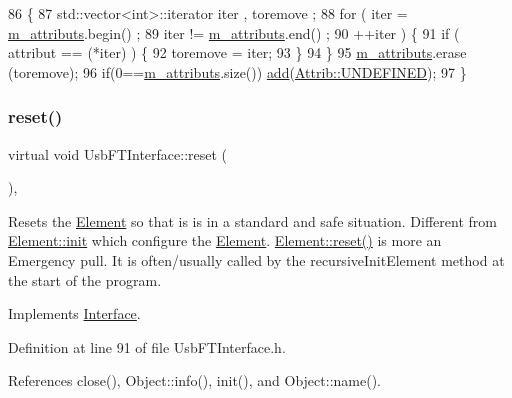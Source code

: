 \begin{DoxyCode}
86                                \{
87     std::vector<int>::iterator iter , toremove ;
88     \textcolor{keywordflow}{for} ( iter  = \hyperlink{classAttrib_ac4bd58a0cc6b38a3b711d609a3d3aacc}{m\_attributs}.begin() ;
89           iter != \hyperlink{classAttrib_ac4bd58a0cc6b38a3b711d609a3d3aacc}{m\_attributs}.end()   ;
90           ++iter ) \{
91       \textcolor{keywordflow}{if} ( attribut == (*iter) ) \{
92         toremove = iter;
93       \}
94     \}
95     \hyperlink{classAttrib_ac4bd58a0cc6b38a3b711d609a3d3aacc}{m\_attributs}.erase (toremove);
96     \textcolor{keywordflow}{if}(0==\hyperlink{classAttrib_ac4bd58a0cc6b38a3b711d609a3d3aacc}{m\_attributs}.size()) \hyperlink{classAttrib_a235f773af19c900264a190b00a3b4ad7}{add}(\hyperlink{classAttrib_a69e171d7cc6417835a5a306d3c764235a3a8da2ab97dda18aebab196fe4100531}{Attrib::UNDEFINED});
97   \}
\end{DoxyCode}
\mbox{\label{classUsbFTInterface_a7bd95c22da69daeaad7f752f560740f4}} 
\subsubsection{\texorpdfstring{reset()}{reset()}}
{\footnotesize\ttfamily virtual void Usb\+F\+T\+Interface\+::reset (\begin{DoxyParamCaption}{ }\end{DoxyParamCaption})\hspace{0.3cm}{\ttfamily [inline]}, {\ttfamily [virtual]}}

Resets the \hyperlink{classElement}{Element} so that is is in a standard and safe situation. Different from \hyperlink{classElement_af42754b5cabc198869222725218d695c}{Element\+::init} which configure the \hyperlink{classElement}{Element}. \hyperlink{classElement_a69efffa22f06909d768149715565cb56}{Element\+::reset()} is more an Emergency pull. It is often/usually called by the recursive\+Init\+Element method at the start of the program. 

Implements \hyperlink{classInterface_a4d44329cea9981a9e0392eaaf99efadd}{Interface}.



Definition at line 91 of file Usb\+F\+T\+Interface.\+h.



References close(), Object\+::info(), init(), and Object\+::name().


